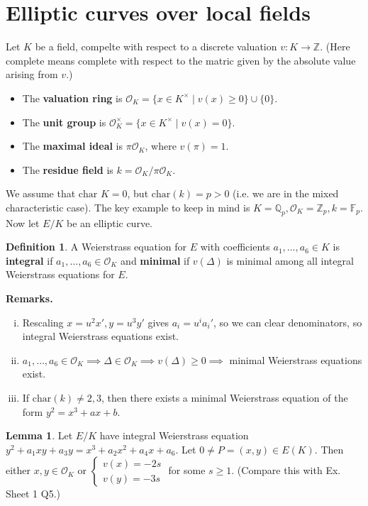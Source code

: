 \documentclass{article}
\theoremstyle{definition}
\newtheorem{lemma}[theorem]{Lemma}
\newtheorem{defn}{Definition}[section]
\begin{document}
\section{Elliptic curves over local fields}
Let $K$ be a field, compelte with respect to a discrete valuation $v : K \to \mathbb{Z}$. (Here complete means complete with respect to the matric given by the absolute value arising from $v$.)
\begin{itemize}
    \item The \textbf{valuation ring} is $\mathcal{O}_K = \{x \in K^\times \mid v(x)\ge 0\} \cup \{0\}$.
    \item The \textbf{unit group} is $\mathcal{O}_K^\times = \{x \in K^\times \mid  v(x) = 0\}$.
    \item The \textbf{maximal ideal} is $\pi \mathcal{O}_K$, where $v(\pi)=1$.
    \item The \textbf{residue field} is $k = \mathcal{O}_K/\pi \mathcal{O}_K$.
\end{itemize}
We assume that $\text{char }K = 0$, but $\text{char}(k) = p >0$ (i.e. we are in the mixed characteristic case). The key example to keep in mind is $K = \mathbb{Q}_p, \mathcal{O}_K = \mathbb{Z}_p, k = \mathbb{F}_p$. Now let $E/K$ be an elliptic curve.
\begin{defn}
    A Weierstrass equation for $E$ with coefficients $a_1,\ldots,a_6 \in K$ is \textbf{integral} if $a_1,\ldots,a_6 \in \mathcal{O}_K$ and \textbf{minimal} if $v(\Delta)$ is minimal among all integral Weierstrass equations for $E$.
\end{defn}
\textbf{Remarks.}
\begin{enumerate}[(i)]
    \item Rescaling $x = u^2x', y= u^3y'$ gives $a_i = u^i a_i'$, so we can clear denominators, so integral Weierstrass equations exist.
    \item $a_1,\ldots,a_6 \in \mathcal{O}_K \implies \Delta \in \mathcal{O}_K \implies v(\Delta)\ge 0 \implies $ minimal Weierstrass equations exist.
    \item If $\text{char}(k) \neq 2,3$, then there exists a minimal Weierstrass equation of the form $y^2 = x^3+ax+b$.
\end{enumerate} 
\begin{lemma}\label{lemma9.1}
    Let $E/K$ have integral Weierstrass equation $y^2+a_1xy+a_3y = x^3+a_2x^2+a_4x+a_6$. Let $0 \neq P = (x,y) \in E(K)$. Then either $x,y \in \mathcal{O}_K$ or $\begin{cases}
        v(x) = -2s\\
        v(y) = -3s
    \end{cases}$
    for some $s\ge 1$. (Compare this with Ex. Sheet 1 Q5.)
\end{lemma}
\end{document}
